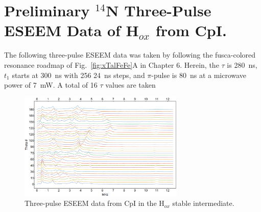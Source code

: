 \chapter[Preliminary ESEEM Data of Hox.]{Preliminary $^{14}$N Three-Pulse ESEEM Data of H$_{ox}$ from CpI.}

The following three-pulse ESEEM data was taken by following the fusca-colored resonance roadmap of Fig.~\ref{fig:xTalFeFe}A in Chapter 6. Herein, the $\tau$ is 280~ns, $t_1$ starts at 300~ns with 256 24~ns steps, and $\pi$-pulse is 80~ns at a microwave power of 7~mW. A total of 16 $\tau$ values are taken 

\begin{figure}[ht]
 \centering
 \includegraphics[angle=90,origin=c,width=0.7\textwidth]{Kapitel/Appendix/ESEEMFirstPeak.eps}
 \caption[Preliminary Three-Pulse ESEEM Data of Hox]{Three-pulse ESEEM data from CpI in the H$_{ox}$ stable intermediate.}
 \label{fig-E:ESEEM}
\end{figure}

